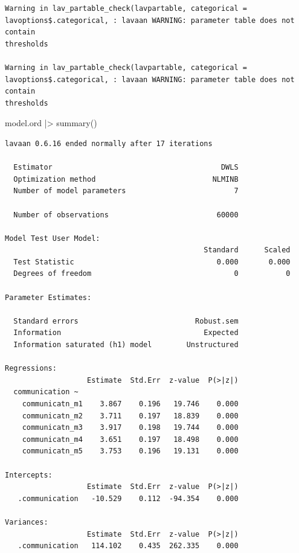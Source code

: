 \documentclass[
  letterpaper,
  DIV=11,
  numbers=noendperiod]{scrreprt}
\newenvironment{Shaded}{\begin{snugshade}}{\end{snugshade}}
\newcommand{\FunctionTok}[1]{\textcolor[rgb]{0.28,0.35,0.67}{#1}}
\newcommand{\NormalTok}[1]{\textcolor[rgb]{0.00,0.23,0.31}{#1}}
\newcommand{\SpecialCharTok}[1]{\textcolor[rgb]{0.37,0.37,0.37}{#1}}
\begin{document}
\begin{verbatim}
Warning in lav_partable_check(lavpartable, categorical =
lavoptions$.categorical, : lavaan WARNING: parameter table does not contain
thresholds

Warning in lav_partable_check(lavpartable, categorical =
lavoptions$.categorical, : lavaan WARNING: parameter table does not contain
thresholds
\end{verbatim}

\begin{Shaded}
\begin{Highlighting}[]
\NormalTok{model.ord }\SpecialCharTok{|\textgreater{}} \FunctionTok{summary}\NormalTok{()}
\end{Highlighting}
\end{Shaded}

\begin{verbatim}
lavaan 0.6.16 ended normally after 17 iterations

  Estimator                                       DWLS
  Optimization method                           NLMINB
  Number of model parameters                         7

  Number of observations                         60000

Model Test User Model:
                                              Standard      Scaled
  Test Statistic                                 0.000       0.000
  Degrees of freedom                                 0           0

Parameter Estimates:

  Standard errors                           Robust.sem
  Information                                 Expected
  Information saturated (h1) model        Unstructured

Regressions:
                   Estimate  Std.Err  z-value  P(>|z|)
  communication ~                                     
    communicatn_m1    3.867    0.196   19.746    0.000
    communicatn_m2    3.711    0.197   18.839    0.000
    communicatn_m3    3.917    0.198   19.744    0.000
    communicatn_m4    3.651    0.197   18.498    0.000
    communicatn_m5    3.753    0.196   19.131    0.000

Intercepts:
                   Estimate  Std.Err  z-value  P(>|z|)
   .communication   -10.529    0.112  -94.354    0.000

Variances:
                   Estimate  Std.Err  z-value  P(>|z|)
   .communication   114.102    0.435  262.335    0.000
\end{verbatim}
\end{document}
